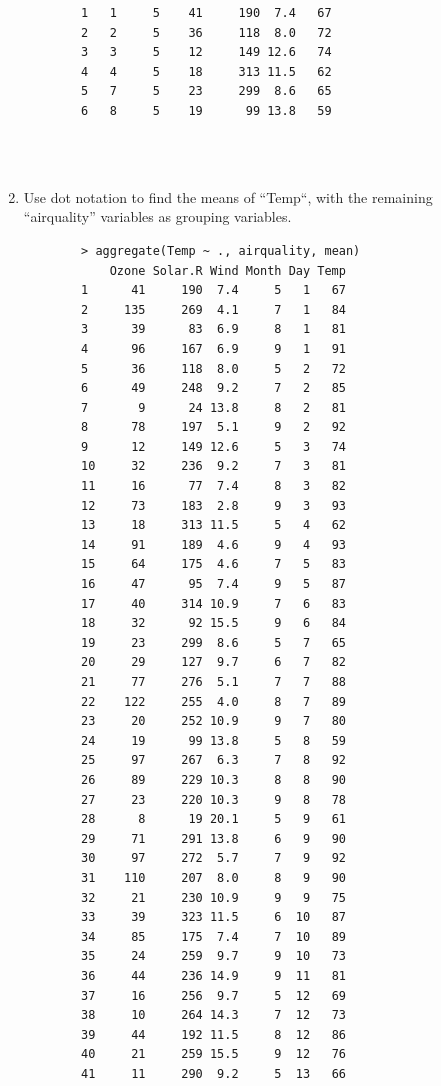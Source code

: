 \documentclass[10pt]{article}
\begin{document}
\begin{enumerate}
\begin{verbatim}
        1   1     5    41     190  7.4   67
        2   2     5    36     118  8.0   72
        3   3     5    12     149 12.6   74
        4   4     5    18     313 11.5   62
        5   7     5    23     299  8.6   65
        6   8     5    19      99 13.8   59
        \end{verbatim} \\ \\
    \item Use dot notation to find the means of “Temp“, with the remaining “airquality” variables as grouping variables.
        \begin{verbatim}
        > aggregate(Temp ~ ., airquality, mean)
            Ozone Solar.R Wind Month Day Temp
        1      41     190  7.4     5   1   67
        2     135     269  4.1     7   1   84
        3      39      83  6.9     8   1   81
        4      96     167  6.9     9   1   91
        5      36     118  8.0     5   2   72
        6      49     248  9.2     7   2   85
        7       9      24 13.8     8   2   81
        8      78     197  5.1     9   2   92
        9      12     149 12.6     5   3   74
        10     32     236  9.2     7   3   81
        11     16      77  7.4     8   3   82
        12     73     183  2.8     9   3   93
        13     18     313 11.5     5   4   62
        14     91     189  4.6     9   4   93
        15     64     175  4.6     7   5   83
        16     47      95  7.4     9   5   87
        17     40     314 10.9     7   6   83
        18     32      92 15.5     9   6   84
        19     23     299  8.6     5   7   65
        20     29     127  9.7     6   7   82
        21     77     276  5.1     7   7   88
        22    122     255  4.0     8   7   89
        23     20     252 10.9     9   7   80
        24     19      99 13.8     5   8   59
        25     97     267  6.3     7   8   92
        26     89     229 10.3     8   8   90
        27     23     220 10.3     9   8   78
        28      8      19 20.1     5   9   61
        29     71     291 13.8     6   9   90
        30     97     272  5.7     7   9   92
        31    110     207  8.0     8   9   90
        32     21     230 10.9     9   9   75
        33     39     323 11.5     6  10   87
        34     85     175  7.4     7  10   89
        35     24     259  9.7     9  10   73
        36     44     236 14.9     9  11   81
        37     16     256  9.7     5  12   69
        38     10     264 14.3     7  12   73
        39     44     192 11.5     8  12   86
        40     21     259 15.5     9  12   76
        41     11     290  9.2     5  13   66

\end{verbatim}
\end{enumerate}
\end{document}

